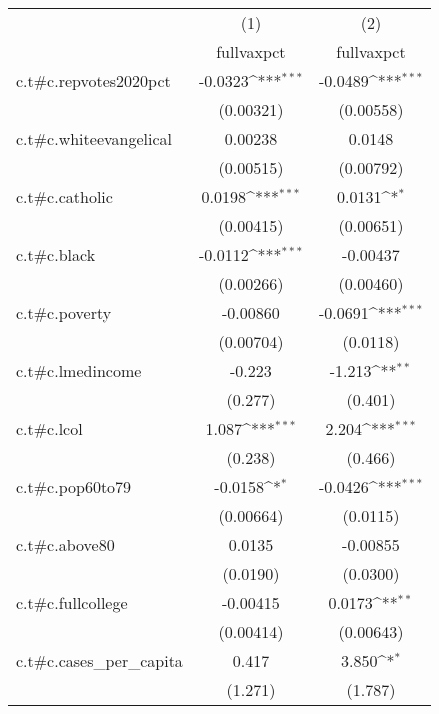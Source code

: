 {
\def\sym#1{\ifmmode^{#1}\else\(^{#1}\)\fi}
\begin{tabular}{l*{2}{c}}
\hline\hline
            &\multicolumn{1}{c}{(1)}&\multicolumn{1}{c}{(2)}\\
            &\multicolumn{1}{c}{fullvaxpct}&\multicolumn{1}{c}{fullvaxpct}\\
\hline
c.t#c.repvotes2020pct&     -0.0323\sym{***}&     -0.0489\sym{***}\\
            &   (0.00321)         &   (0.00558)         \\
[1em]
c.t#c.whiteevangelical&     0.00238         &      0.0148         \\
            &   (0.00515)         &   (0.00792)         \\
[1em]
c.t#c.catholic&      0.0198\sym{***}&      0.0131\sym{*}  \\
            &   (0.00415)         &   (0.00651)         \\
[1em]
c.t#c.black &     -0.0112\sym{***}&    -0.00437         \\
            &   (0.00266)         &   (0.00460)         \\
[1em]
c.t#c.poverty&    -0.00860         &     -0.0691\sym{***}\\
            &   (0.00704)         &    (0.0118)         \\
[1em]
c.t#c.lmedincome&      -0.223         &      -1.213\sym{**} \\
            &     (0.277)         &     (0.401)         \\
[1em]
c.t#c.lcol  &       1.087\sym{***}&       2.204\sym{***}\\
            &     (0.238)         &     (0.466)         \\
[1em]
c.t#c.pop60to79&     -0.0158\sym{*}  &     -0.0426\sym{***}\\
            &   (0.00664)         &    (0.0115)         \\
[1em]
c.t#c.above80&      0.0135         &    -0.00855         \\
            &    (0.0190)         &    (0.0300)         \\
[1em]
c.t#c.fullcollege&    -0.00415         &      0.0173\sym{**} \\
            &   (0.00414)         &   (0.00643)         \\
[1em]
c.t#c.cases\_per\_capita&       0.417         &       3.850\sym{*}  \\
            &     (1.271)         &     (1.787)         \\

\end{tabular}}
